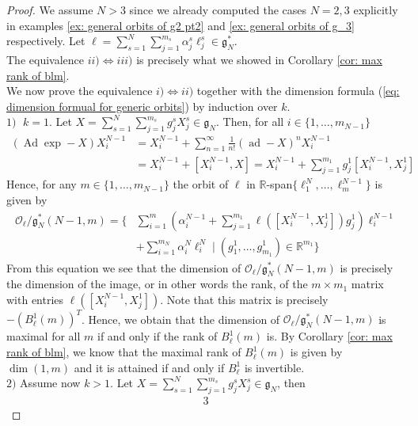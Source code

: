 \documentclass[pdflatex,sn-mathphys-num]{sn-jnl}
\theoremstyle{thmstyletwo}
\theoremstyle{thmstyleone}
\theoremstyle{thmstyletwo}
\newcommand{\fancyg}{\mathfrak{g}}
\newcommand{\Adjoint}{\operatorname{Ad}}
\begin{document}
	\begin{proof}
		We assume $N > 3$ since we already computed the cases $N=2,3$ explicitly in examples \ref{ex: general orbits of g2 pt2} and \ref{ex: general orbits of g_3} respectively.
		Let $\ell = \sum_{s=1}^{N}\sum_{j=1}^{m_s}\alpha_j^s\ell_j^s \in \fancyg_{N}^*$.\\
		The equivalence $ii) \iff iii)$ is precisely what we showed in Corollary \ref{cor: max rank of blm}.\\   
		We now prove the equivalence $i) \iff ii)$ together with the dimension formula (\ref{eq: dimension formual for generic orbits}) by induction over $k$.\\
		$1)\;$ $k = 1$. Let $X = \sum_{s=1}^{N}\sum_{j=1}^{m_s}g_j^sX_j^s \in \fancyg_{N}$. Then, for all $i \in \{1, \ldots, m_{N-1}\}$
		\begin{align*}
			(\Adjoint \operatorname{exp}-X)X_i^{N-1} &= X_i^{N-1} + \sum_{n=1}^{\infty}\frac{1}{n!}(\operatorname{ad}-X)^n X_i^{N-1}\\
			&=  X_i^{N-1} + [X_i^{N-1}, X] = X_i^{N-1} + \sum_{j=1}^{m_1}g_j^1[X_i^{N-1},X_j^1]
		\end{align*}
		Hence, for any $m \in \{1, \ldots, m_{N-1}\}$ the orbit of $\ell$ in $\mathbb{R}$-span$\{\ell_1^N, \ldots, \ell_{m}^{N-1}\}$ is given by
		\begin{align*}
			\mathcal{O}_{\ell} / \fancyg_N^*(N-1, m) = \Bigg\{ 
			& \sum_{i=1}^{m} \left(\alpha_i^{N-1} + \sum_{j=1}^{m_1} \ell([X_i^{N-1}, X_j^1])g_j^1\right) \ell_i^{N-1} \\
			& + \sum_{i=1}^{m_N} \alpha_i^N \ell_i^N \; \Big| \; (g_1^1, \ldots, g_{m_1}^1) \in \mathbb{R}^{m_1} \Bigg\}
		\end{align*}
		From this equation we see that the dimension of $\mathcal{O}_{\ell} / \fancyg_N^*(N-1, m)$ is precisely the dimension of the image, or in other words the rank, of the $m \times m_1$ matrix with entries $\ell([X_i^{N-1}, X_j^1])$. Note that this matrix is precisely $-(B_{\ell}^{1}(m))^T$. Hence, we obtain that the dimension of $\mathcal{O}_{\ell} / \fancyg_N^*(N-1, m)$ is maximal for all $m$ if and only if the rank of $B_{\ell}^{1}(m)$ is. By Corollary \ref{cor: max rank of blm}, we know that the maximal rank of $B_{\ell}^{1}(m)$ is given by $\dim(1,m)$ and it is attained if and only if $B_{\ell}^1$ is invertible\vspace{5pt}.\\  
		\noindent $2)$ Assume now $k>1$. Let $X = \sum_{s=1}^{N}\sum_{j=1}^{m_s}g_j^sX_j^s \in \fancyg_{N}$, then
		\begin{alignat*}{3}

\end{alignat*}
\end{proof}
\end{document}
